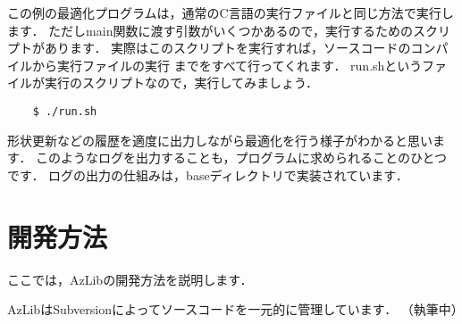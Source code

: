 この例の最適化プログラムは，通常のC言語の実行ファイルと同じ方法で実行します．
ただしmain関数に渡す引数がいくつかあるので，実行するためのスクリプトがあります．
実際はこのスクリプトを実行すれば，ソースコードのコンパイルから実行ファイルの実行
までをすべて行ってくれます．
run.shというファイルが実行のスクリプトなので，実行してみましょう．
\begin{verbatim}
    $ ./run.sh
\end{verbatim}

形状更新などの履歴を適度に出力しながら最適化を行う様子がわかると思います．
このようなログを出力することも，プログラムに求められることのひとつです．
ログの出力の仕組みは，baseディレクトリで実装されています．


\section{開発方法} \label{sec:abstract_develop}
ここでは，AzLibの開発方法を説明します．

AzLibはSubversionによってソースコードを一元的に管理しています．
（執筆中）

